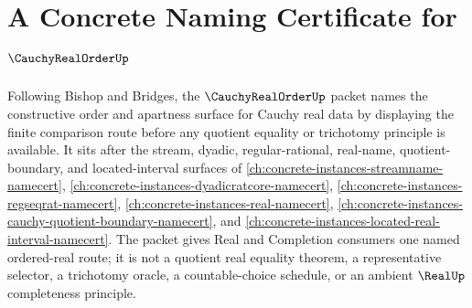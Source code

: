\chapter{A Concrete Naming Certificate for $\CauchyRealOrderUp$}
\label{ch:concrete-instances-cauchy-real-order-namecert}

Following Bishop and Bridges, the $\CauchyRealOrderUp$ packet names the constructive order and apartness surface for Cauchy real data by displaying the finite comparison route before any quotient equality or trichotomy principle is available. It sits after the stream, dyadic, regular-rational, real-name, quotient-boundary, and located-interval surfaces of \autoref{ch:concrete-instances-streamname-namecert}, \autoref{ch:concrete-instances-dyadicratcore-namecert}, \autoref{ch:concrete-instances-regseqrat-namecert}, \autoref{ch:concrete-instances-real-namecert}, \autoref{ch:concrete-instances-cauchy-quotient-boundary-namecert}, and \autoref{ch:concrete-instances-located-real-interval-namecert}. The packet gives Real and Completion consumers one named ordered-real route; it is not a quotient real equality theorem, a representative selector, a trichotomy oracle, a countable-choice schedule, or an ambient $\RealUp$ completeness principle.

